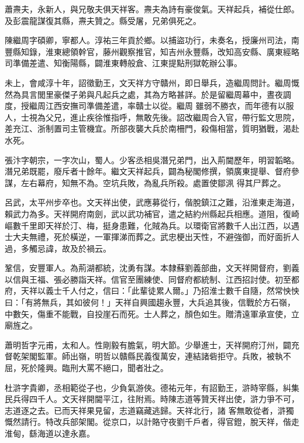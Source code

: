 \begin{pinyinscope}
 蕭燾夫，永新人，與兄敬夫俱天祥客。燾夫為詩有豪俊氣。天祥起兵，補從仕郎。及彭震龍謀復其縣，燾夫贊之。縣受屠，兄弟俱死之。



 陳繼周字碩卿，寧都人。淳祐三年貢於鄉。以捕盜功行，未奏名，授廉州司法，南豐縣知錄，淮東總領幹官，藤州觀察推官，知吉州永豐縣，改知高安縣、廣東經略司準備差遣、知衡陽縣，闢淮東轉般倉、江東提點刑獄乾辦公事。



 未上，會咸淳十年，詔徵勤王，文天祥方守贛州，即日舉兵，造繼周問計。繼周慨然為具言閭里豪傑子弟與凡起兵之處，其為方略甚詳。於是留繼周幕中，晝夜調度，授繼周江西安撫司準備差遣，率贛士以從。繼周
 雖弱不勝衣，而年德有以服人，士視為父兄，進止疾徐惟指呼，無敢先後。詔改繼周合入官，帶行監文思院，差充江、浙制置司主管機宜。所部夜襲大兵於南柵門，殺傷相當，質明猶戰，渴赴水死。



 張汴字朝宗，一字次山，蜀人。少客丞相吳潛兄弟門，出入荊閫歷年，明習韜略。潛兄弟既罷，廢斥者十餘年。繼文天祥起兵，闢為秘閣修撰，領廣東提舉、督府參謀，左右幕府，知無不為。空坑兵敗，為亂兵所殺。處置使鄒洬
 得其尸葬之。



 呂武，太平州步卒也。文天祥出使，武應募從行，偕脫鎮江之難，沿淮東走海道，賴武力為多。天祥開府南劍，武以武功補官，遣之結約州縣起兵相應。道阻，復崎嶇數千里即天祥於汀、梅，挺身患難，化賊為兵。以環衛官將數千人出江西，以遇士大夫無禮，死於橫逆，一軍揮涕而葬之。武忠梗出天性，不避強御，而好面折人過，多觸忌諱，故及於禍云。



 鞏信，安豐軍人。為荊湖都統，沈勇有謀。本隸蘇劉義部曲，文天祥開督府，劉義以信與王福、張必勝詣天祥。信官至團練使、同督府都統制、江西招討使。初至都府，天祥以義士千人付之，信曰：「此輩徒累人爾。」乃招淮士數千自隨，然常怏怏曰：「有將無兵，其如彼何！」天祥自興國趨永豐，大兵追其後，信戰於方石嶺，中數矢，傷重不能戰，自投崖石而死。士人葬之，顏色如生。贈清遠軍承宣使，立廟旌之。



 蕭明哲字元甫，太和人。性剛毅有膽氣，明大節。少舉進士，天祥開府汀州，闢充督乾架閣監軍。師出嶺，明哲以贛縣民義復萬安，連結諸砦拒守。兵敗，被執不屈，死於隆興。臨刑大罵不絕口，聞者壯之。



 杜滸字貴卿，丞相範從子也，少負氣游俠。德祐元年，有詔勤王，滸時宰縣，糾集民兵得四千人。文天祥開閫平江，往附焉。時陳志道等贊天祥出使，滸力爭不可，志道逐之去。已而天祥果見留，志道竊藏逃歸。天祥北行，諸
 客無敢從者，滸獨慨然請行。特改兵部架閣。從京口，以計賂守夜劉千戶者，得官鐙，脫天祥，偕走淮甸，繇海道以達永嘉。




\end{pinyinscope}
